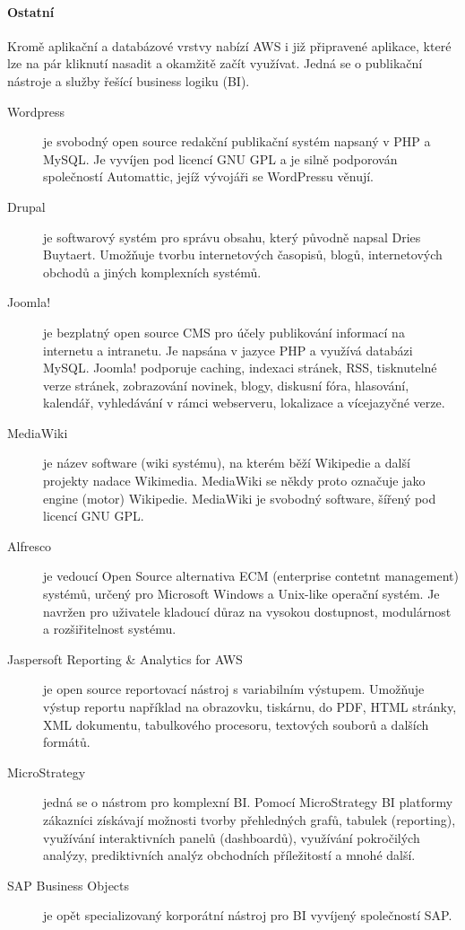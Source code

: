\paragraph{Ostatní}
Kromě aplikační a databázové vrstvy nabízí AWS i již připravené aplikace, které lze na pár kliknutí nasadit a okamžitě začít využívat. Jedná se o publikační nástroje a služby řešící business logiku (BI).
\begin{description}
	\item [Wordpress] je svobodný open source redakční publikační systém napsaný v PHP a MySQL. Je vyvíjen pod licencí GNU GPL a je silně podporován společností Automattic, jejíž vývojáři se WordPressu věnují.\cite{wiki:wordpress}
	\item [Drupal] je softwarový systém pro správu obsahu, který původně napsal Dries Buytaert. Umožňuje tvorbu internetových časopisů, blogů, internetových obchodů a jiných komplexních systémů.\cite{wiki:drupal}
	\item [Joomla!] je bezplatný open source CMS pro účely publikování informací na internetu a intranetu. Je napsána v jazyce PHP a využívá databázi MySQL. Joomla! podporuje caching, indexaci stránek, RSS, tisknutelné verze stránek, zobrazování novinek, blogy, diskusní fóra, hlasování, kalendář, vyhledávání v rámci webserveru, lokalizace a vícejazyčné verze.\cite{wiki:joomla}
	\item [MediaWiki] je název software (wiki systému), na kterém běží Wikipedie a další projekty nadace Wikimedia. MediaWiki se někdy proto označuje jako engine (motor) Wikipedie. MediaWiki je svobodný software, šířený pod licencí GNU GPL.\cite{wiki:mediawiki}
	\item [Alfresco] je vedoucí Open Source alternativa ECM (enterprise contetnt management) systémů, určený pro Microsoft Windows a Unix-like operační systém. Je navržen pro uživatele kladoucí důraz na vysokou dostupnost, modulárnost a rozšiřitelnost systému.\cite{wiki:alfresco}
	\item [Jaspersoft Reporting \& Analytics for AWS] je open source reportovací nástroj s variabilním výstupem. Umožňuje výstup reportu například na obrazovku, tiskárnu, do PDF, HTML stránky, XML dokumentu, tabulkového procesoru, textových souborů a dalších formátů.
	\item [MicroStrategy] jedná se o nástrom pro komplexní BI. Pomocí MicroStrategy BI platformy zákazníci získávají možnosti tvorby přehledných grafů, tabulek (reporting), využívání interaktivních panelů (dashboardů), využívání pokročilých analýzy, prediktivních analýz obchodních příležitostí a mnohé další\cite{oksystem:microstrategy}.
	\item [SAP Business Objects] je opět specializovaný korporátní nástroj pro BI vyvíjený společností SAP.
\end{description}

